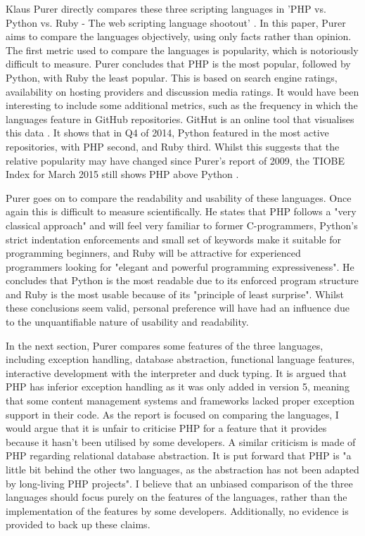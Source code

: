\documentclass[authoryearcitations]{UoYCSproject}
\begin{document}
Klaus Purer directly compares these three scripting languages in 'PHP vs. Python vs. Ruby - The web scripting language shootout' \citep{Purer2009}. In this paper, Purer aims to compare the languages objectively, using only facts rather than opinion. The first metric used to compare the languages is popularity, which is notoriously difficult to measure. Purer concludes that PHP is the most popular, followed by Python, with Ruby the least popular. This is based on search engine ratings, availability on hosting providers and discussion media ratings. It would have been interesting to include some additional metrics, such as the frequency in which the languages feature in GitHub repositories. GitHut is an online tool that visualises this data \citep{Zapponi2014}. It shows that in Q4 of 2014, Python featured in the most active repositories, with PHP second, and Ruby third. Whilst this suggests that the relative popularity may have changed since Purer's report of 2009, the TIOBE Index for March 2015 still shows PHP above Python \citep{TIOBESoftware2015}. 

Purer goes on to compare the readability and usability of these languages. Once again this is difficult to measure scientifically. He states that PHP follows a "very classical approach" and will feel very familiar to former C-programmers, Python's strict indentation enforcements and small set of keywords make it suitable for programming beginners, and Ruby will be attractive for experienced programmers looking for "elegant and powerful programming expressiveness". He concludes that Python is the most readable due to its enforced program structure and Ruby is the most usable because of its "principle of least surprise". Whilst these conclusions seem valid, personal preference will have had an influence due to the unquantifiable nature of usability and readability. 

In the next section, Purer compares some features of the three languages, including exception handling, database abstraction, functional language features, interactive development  with the interpreter and duck typing. It is argued that PHP has inferior exception handling as it was only added in version 5, meaning that some content management systems and frameworks lacked proper exception support in their code. As the report is focused on comparing the languages, I would argue that it is unfair to criticise PHP for a feature that it provides because it hasn't been utilised by some developers. A similar criticism is made of PHP regarding relational database abstraction. It is put forward that PHP is "a little bit behind the other two languages, as the abstraction has not been adapted by long-living PHP projects". I believe that an unbiased comparison of the three languages should focus purely on the features of the languages, rather than the implementation of the features by some developers. Additionally, no evidence is provided to back up these claims. 
\end{document}
